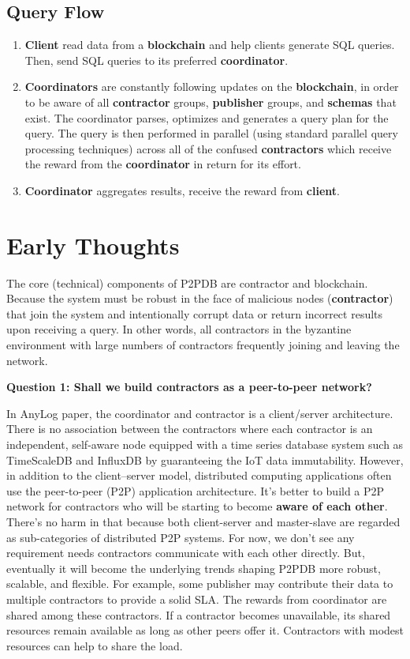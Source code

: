 \documentclass[12pt]{article}
\begin{document}
\subsection{Query Flow}


\begin{enumerate}
\item \textbf{Client} read data from a \textbf{blockchain} and help clients generate SQL queries. Then, send SQL queries to its preferred \textbf{coordinator}.
\item \textbf{Coordinators} are constantly following updates on the \textbf{blockchain}, in order to be aware of all \textbf{contractor} groups, \textbf{publisher} groups, and \textbf{schemas} that exist. The coordinator parses, optimizes and generates a query plan for the query. The query is then performed in parallel (using standard parallel query processing techniques) across all of the confused \textbf{contractors} which receive the reward from the \textbf{coordinator} in return for its effort. 
\item \textbf{Coordinator} aggregates results, receive the reward from \textbf{client}.
\end{enumerate}

\section{Early Thoughts}

The core (technical) components of P2PDB are contractor and blockchain. Because the system must be robust in the face of malicious nodes (\textbf{contractor}) that join the system and intentionally corrupt data or return incorrect results upon receiving a query. In other words, all contractors in the byzantine environment with large numbers of contractors frequently joining and leaving the network. 

\noindent \textbf{Question 1: Shall we build contractors as a peer-to-peer network?}

In AnyLog paper, the coordinator and contractor is a client/server architecture. 
There is no association between the contractors where each contractor is an independent, self-aware node equipped with a time series database system such as TimeScaleDB \cite{timescaledb} and InfluxDB \cite{influxdb} by guaranteeing the IoT data immutability. However, in addition to the client–server model, distributed computing applications often use the peer-to-peer (P2P) application architecture. It's better to build a P2P network for contractors who will be starting to become \textbf{aware of each other}. There's no harm in that because both client-server and master-slave are regarded as sub-categories of distributed P2P systems. For now, we don't see any requirement needs contractors communicate with each other directly. But, eventually it will become the underlying trends shaping P2PDB more robust, scalable, and flexible. For example, some publisher may contribute their data to multiple contractors to provide a solid SLA. The rewards from coordinator are shared among these contractors. If a contractor becomes unavailable, its shared resources remain available as long as other peers offer it. Contractors with modest resources can help to share the load. \\
\end{document}
